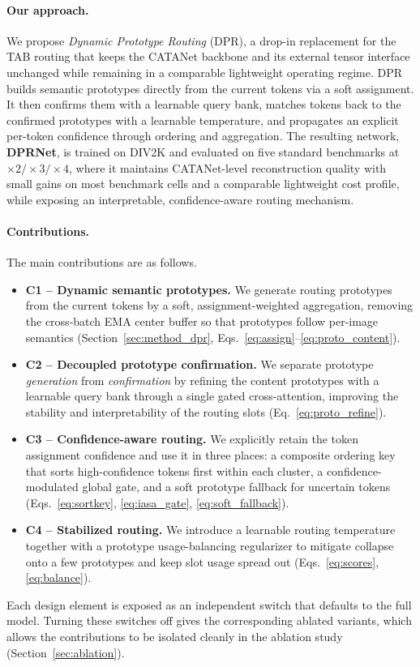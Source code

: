 \paragraph{Our approach.}
We propose \emph{Dynamic Prototype Routing} (DPR), a drop-in replacement for the
TAB routing that keeps the CATANet backbone and its external tensor interface
unchanged while remaining in a comparable lightweight operating regime. DPR builds
semantic prototypes directly from the current tokens via a soft assignment. It then
confirms them with a learnable query bank, matches tokens back to the confirmed
prototypes with a learnable temperature, and propagates an explicit per-token
confidence through ordering and aggregation. The resulting network,
\textbf{DPRNet}, is trained on DIV2K and evaluated on five standard benchmarks at
$\times2/\times3/\times4$, where it maintains CATANet-level reconstruction quality
with small gains on most benchmark cells and a comparable lightweight cost profile,
while exposing an interpretable, confidence-aware routing
mechanism.

\paragraph{Contributions.}
The main contributions are as follows.
\begin{itemize}
  \item \textbf{C1 -- Dynamic semantic prototypes.} We generate routing prototypes
  from the current tokens by a soft, assignment-weighted aggregation, removing the
  cross-batch EMA center buffer so that prototypes follow per-image semantics
  (Section~\ref{sec:method_dpr}, Eqs.~\eqref{eq:assign}--\eqref{eq:proto_content}).
  \item \textbf{C2 -- Decoupled prototype confirmation.} We separate prototype
  \emph{generation} from \emph{confirmation} by refining the content prototypes
  with a learnable query bank through a single gated cross-attention, improving the
  stability and interpretability of the routing slots
  (Eq.~\eqref{eq:proto_refine}).
  \item \textbf{C3 -- Confidence-aware routing.} We explicitly retain the token
  assignment confidence and use it in three places: a composite ordering key that
  sorts high-confidence tokens first within each cluster, a confidence-modulated
  global gate, and a soft prototype fallback for uncertain tokens
  (Eqs.~\eqref{eq:sortkey}, \eqref{eq:iasa_gate}, \eqref{eq:soft_fallback}).
  \item \textbf{C4 -- Stabilized routing.} We introduce a learnable routing
  temperature together with a prototype usage-balancing regularizer to mitigate
  collapse onto a few prototypes and keep slot usage spread out
  (Eqs.~\eqref{eq:scores}, \eqref{eq:balance}).
\end{itemize}
Each design element is exposed as an independent switch that defaults to the full
model. Turning these switches off gives the corresponding ablated variants, which
allows the contributions to be isolated cleanly in the ablation study
(Section~\ref{sec:ablation}).
